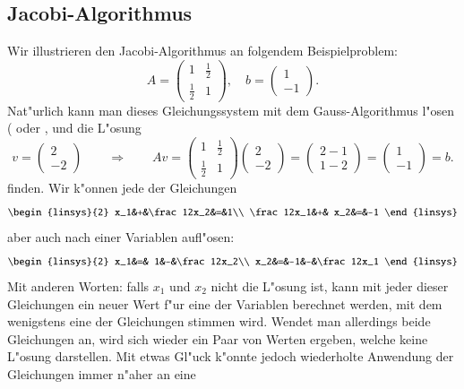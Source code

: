 \subsection{Jacobi-Algorithmus}
Wir illustrieren den Jacobi-Algorithmus an folgendem Beispielproblem:
\begin{equation}
A=\begin{pmatrix}1&\frac12\\\frac12&1\end{pmatrix},\quad
b=\begin{pmatrix}1\\-1\end{pmatrix}.
\label{jacobi-beispiel}
\end{equation}
Nat"urlich kann man dieses Gleichungssystem mit dem Gauss-Algorithmus
l"osen (\cite[Kapitel 1]{skript:linalg} oder \cite[Chapter 1]{skript:watkins},
und die L"osung
\[
v=\begin{pmatrix}2\\-2\end{pmatrix}\qquad\Rightarrow\qquad
Av=
\begin{pmatrix}1&\frac12\\\frac12&1\end{pmatrix}
\begin{pmatrix}2\\-2\end{pmatrix}
=
\begin{pmatrix}2-1\\1-2\end{pmatrix}
=
\begin{pmatrix}1\\-1\end{pmatrix}=b.
\]
finden. Wir k"onnen jede der Gleichungen 
\[
\begin{linsys}{2}
       x_1&+&\frac12x_2&=&1\\
\frac12x_1&+&       x_2&=&-1
\end{linsys}
\]
aber auch nach einer Variablen aufl"osen:
\[
\begin{linsys}{2}
x_1&=& 1&-&\frac12x_2\\
x_2&=&-1&-&\frac12x_1
\end{linsys}
\]
Mit anderen Worten: falls $x_1$ und $x_2$
nicht die L"osung ist, kann mit jeder dieser Gleichungen ein neuer
Wert f"ur eine der Variablen berechnet werden, mit dem wenigstens
eine der Gleichungen stimmen wird.
Wendet man allerdings beide
Gleichungen an, wird sich wieder ein Paar von Werten ergeben,
welche keine L"osung darstellen. Mit etwas Gl"uck k"onnte jedoch
wiederholte Anwendung der Gleichungen immer n"aher an eine 
